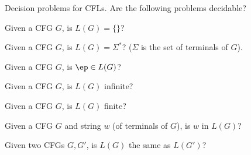   Decision problems for CFLs.
  Are the following problems decidable?
  \begin{tightlist}
    \item Given a CFG $G$, is $L(G) = \{\}$?
    \item Given a CFG $G$, is $L(G) = \Sigma^*$? ($\Sigma$ is the
    set of terminals of $G$).
    \item Given a CFG $G$, is $\ep \in L(G)$?
    \item Given a CFG $G$, is $L(G)$ infinite?
    \item Given a CFG $G$, is $L(G)$ finite?
    \item Given a CFG $G$ and string $w$ (of terminals of $G$),
    is $w$ in $L(G)$?
    \item Given two CFGs $G, G'$, is $L(G)$ the same as $L(G')$?
  \end{tightlist}
